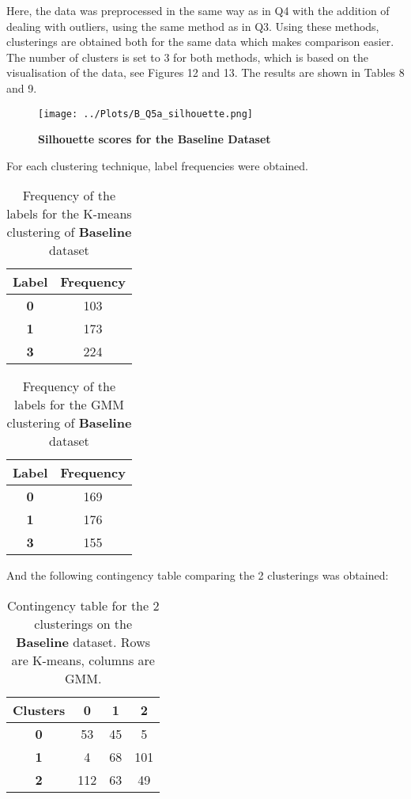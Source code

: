 \documentclass[12pt]{report} %
\begin{document}
Here, the data was preprocessed in the same way as in Q4 with the addition of dealing with outliers, using the same method as in Q3.
Using these methods, clusterings are obtained both for the same data which makes comparison easier. The number of clusters is set to 3 for both methods, which is based on the visualisation of the data, see Figures 12 and 13. The results are shown in Tables 8 and 9.

\begin{figure}[htbp]
    \centering
    \texttt{[image: ../Plots/B\_Q5a\_silhouette.png]}
    \caption{\textbf{Silhouette scores for the Baseline Dataset}}
\end{figure}

For each clustering technique, label frequencies were obtained.

\begin{table}[h]
    \centering
    \begin{tabular}{ |c|c| }
        \hline
        \textbf{Label} & \textbf{Frequency} \\
        \hline
        \textbf{0} & 103 \\ 
        \hline
        \textbf{1} & 173 \\
        \hline
        \textbf{3} & 224 \\
        \hline
    \end{tabular}
    \caption{Frequency of the labels for the K-means clustering of \textbf{Baseline} dataset}
\end{table}

\begin{table}[h]
    \centering
    \begin{tabular}{ |c|c| }
        \hline
        \textbf{Label} & \textbf{Frequency} \\
        \hline
        \textbf{0} & 169 \\ 
        \hline
        \textbf{1} & 176 \\
        \hline
        \textbf{3} & 155 \\
        \hline
    \end{tabular}
    \caption{Frequency of the labels for the GMM clustering of \textbf{Baseline} dataset}
\end{table}

And the following contingency table comparing the 2 clusterings was obtained:

\begin{table}[h]
    \centering
    \begin{tabular}{ |c|c|c|c| }
        \hline
        \textbf{Clusters} & \textbf{0} & \textbf{1} & \textbf{2}\\ 
        \hline
        \textbf{0} & 53 & 45 & 5\\
        \hline
        \textbf{1} & 4 & 68 & 101\\
        \hline
        \textbf{2} & 112 & 63 & 49\\
        \hline
    \end{tabular}
    \caption{Contingency table for the 2 clusterings on the \textbf{Baseline} dataset. Rows are K-means, columns are GMM.}
\end{table}
\end{document}
